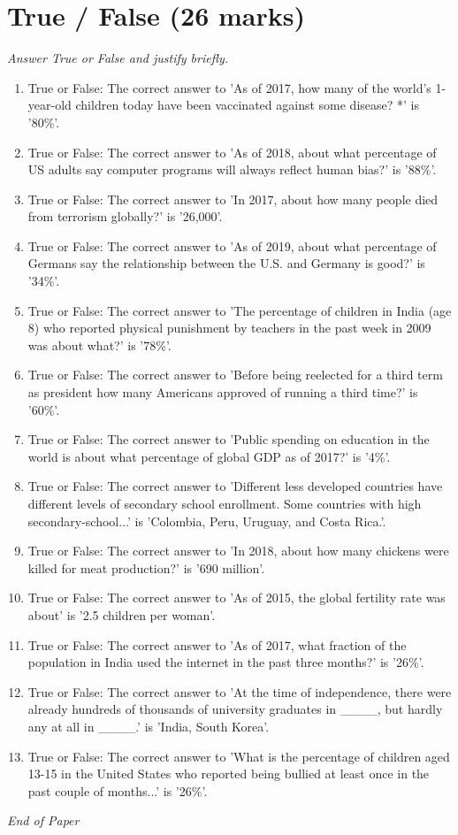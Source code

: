\documentclass[12pt]{article}
\begin{document}
\section*{True / False (26 marks)}
\textit{Answer True or False and justify briefly.}
\begin{enumerate}[label=\arabic*.]
\item True or False: The correct answer to 'As of 2017, how many of the world's 1-year-old children today have been vaccinated against some disease? *' is '80\%'.
\item True or False: The correct answer to 'As of 2018, about what percentage of US adults say computer programs will always reflect human bias?' is '88\%'.
\item True or False: The correct answer to 'In 2017, about how many people died from terrorism globally?' is '26,000'.
\item True or False: The correct answer to 'As of 2019, about what percentage of Germans say the relationship between the U.S. and Germany is good?' is '34\%'.
\item True or False: The correct answer to 'The percentage of children in India (age 8) who reported physical punishment by teachers in the past week in 2009 was about what?' is '78\%'.
\item True or False: The correct answer to 'Before being reelected for a third term as president how many Americans approved of running a third time?' is '60\%'.
\item True or False: The correct answer to 'Public spending on education in the world is about what percentage of global GDP as of 2017?' is '4\%'.
\item True or False: The correct answer to 'Different less developed countries have different levels of secondary school enrollment. Some countries with high secondary-school...' is 'Colombia, Peru, Uruguay, and Costa Rica.'.
\item True or False: The correct answer to 'In 2018, about how many chickens were killed for meat production?' is '690 million'.
\item True or False: The correct answer to 'As of 2015, the global fertility rate was about' is '2.5 children per woman'.
\item True or False: The correct answer to 'As of 2017, what fraction of the population in India used the internet in the past three months?' is '26\%'.
\item True or False: The correct answer to 'At the time of independence, there were already hundreds of thousands of university graduates in \_\_\_\_, but hardly any at all in \_\_\_\_.' is 'India, South Korea'.
\item True or False: The correct answer to 'What is the percentage of children aged 13-15 in the United States who reported being bullied at least once in the past couple of months...' is '26\%'.
\end{enumerate}

\vfill
\noindent\textit{End of Paper}
\end{document}
